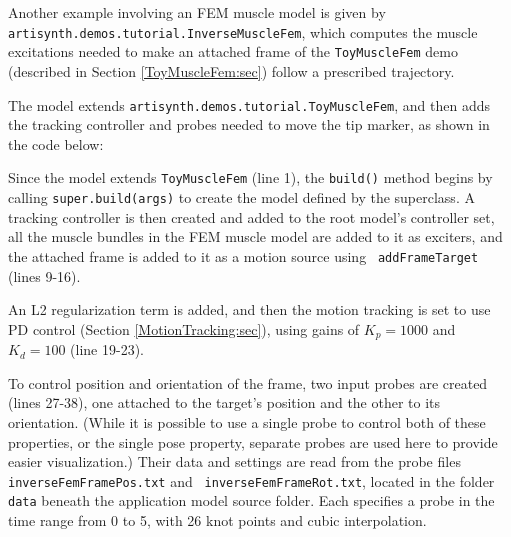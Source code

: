 Another example involving an FEM muscle model is given by {\tt
artisynth.demos.tutorial.InverseMuscleFem}, which computes the muscle
excitations needed to make an attached frame of the {\tt ToyMuscleFem} demo
(described in Section \ref{ToyMuscleFem:sec}) follow a prescribed trajectory.

The model extends {\tt artisynth.demos.tutorial.ToyMuscleFem}, and then adds
the tracking controller and probes needed to move the tip marker, as shown in
the code below:
%
\lstset{numbers=left}
\iflatexml

\else

\fi
\lstset{numbers=none}
%

Since the model extends {\tt ToyMuscleFem} (line 1), the {\tt build()} method
begins by calling {\tt super.build(args)} to create the model defined by the
superclass. A tracking controller is then created and added to the root model's
controller set, all the muscle bundles in the FEM muscle model are added to it
as exciters, and the attached frame is added to it as a motion source using {\tt
addFrameTarget} (lines 9-16).

An L2 regularization term is added, and then the motion tracking is set to use
PD control (Section \ref{MotionTracking:sec}), using gains of $K_p =
1000$ and $K_d = 100$ (line 19-23).

To control position and orientation of the frame, two input probes are created
(lines 27-38), one attached to the target's {\sf position} and the other to its
{\sf orientation}.  (While it is possible to use a single probe to control both
of these properties, or the single {\sf pose} property, separate probes are
used here to provide easier visualization.) Their data and settings are read
from the probe files {\tt inverseFemFramePos.txt} and {\tt
inverseFemFrameRot.txt}, located in the folder {\tt data} beneath the
application model source folder. Each specifies a probe in the time range from
0 to 5, with 26 knot points and cubic interpolation.

